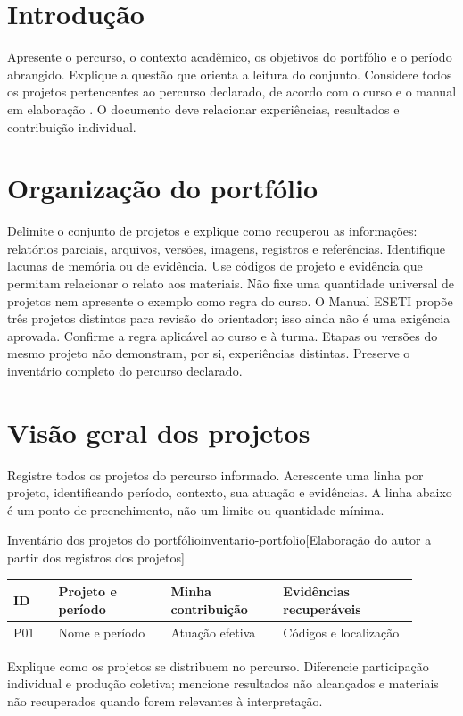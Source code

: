\chapter{Introdução}
Apresente o percurso, o contexto acadêmico, os objetivos do portfólio e o
período abrangido. Explique a questão que orienta a leitura do conjunto.
Considere todos os projetos pertencentes ao percurso declarado, de acordo
com o curso e o manual em elaboração . O documento deve
relacionar experiências, resultados e contribuição individual.

\chapter{Organização do portfólio}
Delimite o conjunto de projetos e explique como recuperou as informações:
relatórios parciais, arquivos, versões, imagens, registros e referências.
Identifique lacunas de memória ou de evidência. Use códigos de projeto e
evidência que permitam relacionar o relato aos materiais. Não fixe uma
quantidade universal de projetos nem apresente o exemplo como regra do curso.
O Manual ESETI propõe três projetos distintos para revisão do orientador;
isso ainda não é uma exigência aprovada. Confirme a regra aplicável ao curso
e à turma. Etapas ou versões do mesmo projeto não demonstram, por si,
experiências distintas. Preserve o inventário completo do percurso declarado.

\chapter{Visão geral dos projetos}
Registre todos os projetos do percurso informado. Acrescente uma linha por
projeto, identificando período, contexto, sua atuação e evidências. A linha
abaixo é um ponto de preenchimento, não um limite ou quantidade mínima.
\begin{undftabela}[H]{Inventário dos projetos do portfólio}{inventario-portfolio}[Elaboração do autor a partir dos registros dos projetos]
\begin{tabular}{@{}p{0.1\linewidth}p{0.25\linewidth}p{0.25\linewidth}p{0.3\linewidth}@{}}
\hline
\textbf{ID} & \textbf{Projeto e período} & \textbf{Minha contribuição} & \textbf{Evidências recuperáveis} \\
\hline
P01 & Nome e período & Atuação efetiva & Códigos e localização \\
\hline
\end{tabular}
\end{undftabela}
Explique como os projetos se distribuem no percurso. Diferencie participação
individual e produção coletiva; mencione resultados não alcançados e materiais
não recuperados quando forem relevantes à interpretação.

